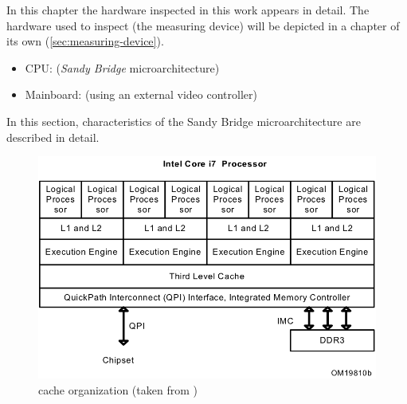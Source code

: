 \label{sec:technical-prerequisites}

In this chapter the hardware inspected in this work appears in detail. The
hardware used to inspect (the measuring device) will be depicted in a
chapter of its own (\ref{sec:measuring-device}).

\label{sec:hw-products}

\begin{itemize}

\item CPU: \JWPcpu{} (\emph{Sandy Bridge}\cite{wiki:snb} microarchitecture)

\item Mainboard: \JWPboard{} (using an external video controller)

\end{itemize}


\label{sec:sandy-bridge}

In this section, characteristics of the Sandy Bridge microarchitecture are
described in detail.

\begin{figure}
  \centering
    \includegraphics[width=\textwidth]{fig/intel-cache-orga.png}
  \caption{\JWPcpu{} cache organization (taken from \cite{intel2011softdev1})}
  \label{fig:cache-orga}
\end{figure}


\label{sec:sandy-brige-general}

